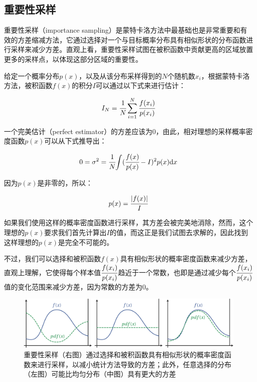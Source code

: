 \subsection{重要性采样}
重要性采样（importance sampling）是蒙特卡洛方法中最基础也是非常重要和有效的方差缩减方法，它通过选择对一个与目标概率分布具有相似形状的分布函数进行采样来减少方差。直观上看，重要性采样试图在被积函数中贡献更高的区域放置更多的采样点，以体现这部分区域的重要性。

给定一个概率分布$p(x)$，以及从该分布采样得到的$N$个随机数$x_i$，根据蒙特卡洛方法，被积函数$f(x)$的积分$I$可以通过以下式来进行估计：

\begin{equation}
	I_N= \cfrac{1}{N}\sum_{i=1}^{N} \cfrac{f(x_i)}{p(x_i)}
\end{equation}

一个完美估计（perfect estimator）的方差应该为0，由此，相对理想的采样概率密度函数$p(x)$可以从下式推导出：

\begin{equation}
	0=\sigma^2= \cfrac{1}{N}{\rm \int}( \cfrac{f(x)}{p(x)}-I)^2p(x){\rm d}x
\end{equation}

\noindent 因为$p(x)$是非零的，所以：

\begin{equation}
	p(x)= \cfrac{|f(x)|}{I}
\end{equation}

如果我们使用这样的概率密度函数进行采样，其方差会被完美地消除，然而，这个理想的$p(x)$要求我们首先计算出$I$的值，而这正是我们试图去求解的，因此找到这样理想的$p(x)$是完全不可能的。

不过，我们可以选择和被积函数$f(x)$具有相似形状的概率密度函数来减少方差，直观上理解，它使得每个样本值$ \cfrac{f(x_i)}{p(x_i)}$趋近于一个常数，也即是通过减少每个$ \cfrac{f(x_i)}{p(x_i)}$值的变化范围来减少方差，因为常数的方差为0。

\begin{figure}
	\includegraphics[width=\textwidth]{figures/mc/mc-11}
	\caption{重要性采样（右图）通过选择和被积函数具有相似形状的概率密度函数来进行采样，以减小统计方法导致的方差；此外，任意选择的分布（左图）可能比均匀分布（中图）具有更大的方差}
	\label{f:mc-importance-sampling}
\end{figure}

